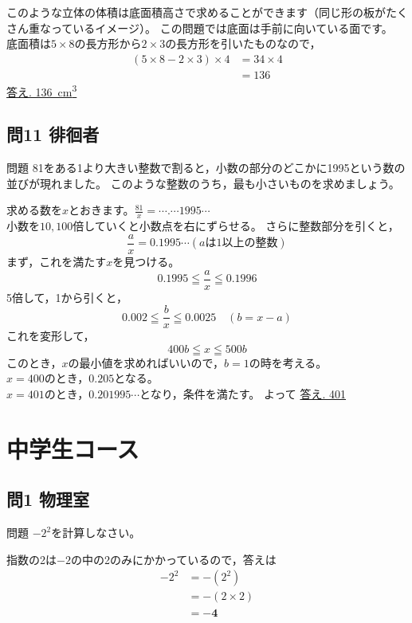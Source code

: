 \documentclass[a5paper]{ltjsarticle}
\begin{document}
このような立体の体積は底面積\times 高さで求めることができます（同じ形の板がたくさん重なっているイメージ）。%
この問題では底面は手前に向いている面です。\\
底面積は$5\times 8$の長方形から$2\times 3$の長方形を引いたものなので，
\begin{align*}
  (5\times 8-2\times 3)\times 4&=34\times 4\\
  &=136
\end{align*}
\underline{答え. \SI{136}{cm^3}}


\subsection*{問11 徘徊者}
\begin{itembox}[l]{問題}
  81をある1より大きい整数で割ると，小数の部分のどこかに1995という数の並びが現れました。
  このような整数のうち，最も小さいものを求めましょう。
\end{itembox}

求める数を$x$とおきます。$\displaystyle \frac{81}{x}=\cdots . \cdots 1995\cdots $\\
小数を$10,100$倍していくと小数点を右にずらせる。
さらに整数部分を引くと，
\[\frac{a}{x}=0.1995\cdots (\text{$a$は1以上の整数})\]
まず，これを満たす$x$を見つける。\\
\[0.1995\leqq \frac{a}{x}\leqq 0.1996\]
5倍して，1から引くと，
\[0.002\leqq \frac{b}{x}\leqq 0.0025\quad (b=x-a)\]
これを変形して，
\[400b \leqq x \leqq 500b\]
このとき，$x$の最小値を求めればいいので，$b=1$の時を考える。\\
$x=400$のとき，$0.205$となる。\\
$x=401$のとき，$0.201995\cdots$となり，条件を満たす。
よって \underline{答え. 401}


\section{中学生コース}
\subsection*{問1 物理室}
\begin{itembox}[l]{問題}
  $-2^2$を計算しなさい。
\end{itembox}

指数の2は$-2$の中の2のみにかかっているので，答えは
\begin{align*}
  -2^2&=-(2^2)\\
&=-(2\times2)\\
&=\mathbf{-4}
\end{align*}
\end{document}
